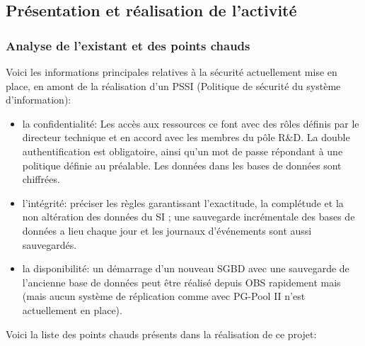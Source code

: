 \documentclass[a4paper, 11pt]{report}
\begin{document}
\subsection{Présentation et réalisation de l'activité}
  \subsubsection{Analyse de l'existant et des points chauds}
  Voici les informations principales relatives à la sécurité actuellement mise en place, en amont de la réalisation d'un PSSI (Politique de sécurité du système d'information):
  \begin{itemize}
    \item la confidentialité: Les accès aux ressources ce font avec des rôles définis par le directeur technique et en accord avec les membres du pôle R&D.
    La double authentification est obligatoire, ainsi qu'un mot de passe répondant à une politique définie au préalable.
    Les données dans les bases de données sont chiffrées.
    \item l’intégrité: préciser les règles garantissant l’exactitude, la complétude et la non altération des données du SI ;
    une sauvegarde incrémentale des bases de données a lieu chaque jour et les journaux d'événements sont aussi sauvegardés.
    \item la disponibilité: un démarrage d'un nouveau SGBD avec une sauvegarde de l'ancienne base de données peut être réalisé depuis OBS rapidement mais (mais aucun système de réplication comme avec PG-Pool II n'est actuellement en place).
  \end{itemize}
  \newline
  \newline
  Voici la liste des points chauds présents dans la réalisation de ce projet:
\end{document}
